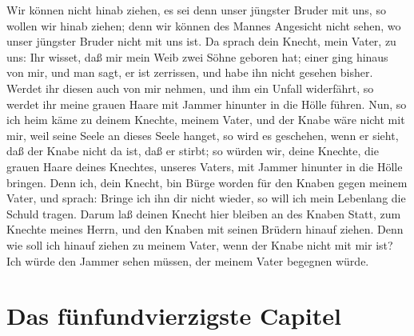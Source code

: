 Wir können nicht hinab ziehen, es sei denn unser jüngster Bruder mit uns, so wollen wir hinab ziehen; denn wir können des Mannes Angesicht nicht sehen, wo unser jüngster Bruder nicht mit uns ist. Da sprach dein Knecht, mein Vater, zu uns: Ihr wisset, daß mir mein Weib zwei Söhne geboren hat; einer ging hinaus von mir, und man sagt, er ist zerrissen, und habe ihn nicht gesehen bisher. Werdet ihr diesen auch von mir nehmen, und ihm ein Unfall widerfährt, so werdet ihr meine grauen Haare mit Jammer hinunter in die Hölle führen. Nun, so ich heim käme zu deinem Knechte, meinem Vater, und der Knabe wäre nicht mit mir, weil seine Seele an dieses Seele hanget, so wird es geschehen, wenn er sieht, daß der Knabe nicht da ist, daß er stirbt; so würden wir, deine Knechte,
die grauen Haare deines Knechtes, unseres Vaters, mit Jammer hinunter in die Hölle bringen. Denn ich, dein Knecht, bin Bürge worden für den Knaben gegen meinem Vater, und sprach: Bringe ich ihn dir nicht wieder, so will ich mein Lebenlang die Schuld tragen. Darum laß deinen Knecht hier bleiben an des Knaben Statt, zum Knechte meines Herrn, und den Knaben mit seinen Brüdern hinauf ziehen. Denn wie soll ich hinauf ziehen zu meinem Vater, wenn der Knabe nicht mit mir ist? Ich würde den Jammer sehen müssen, der meinem Vater begegnen würde.

\section{Das fünfundvierzigste Capitel}

